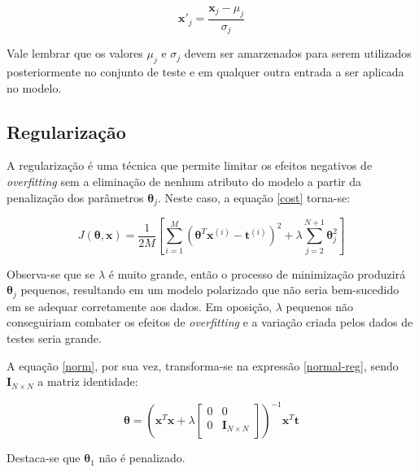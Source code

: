 \documentclass[10pt,twocolumn,letterpaper]{article}
\begin{document}
\begin {equation}
\label {norm}
\bm {x'}_j = \frac {\bm{x}_j - \mu_j}{\sigma_j}
\end{equation}

Vale lembrar que os valores \(\mu_j\) e \(\sigma_j\) devem ser amarzenados para serem utilizados posteriormente no conjunto de teste e em qualquer outra entrada a ser aplicada no modelo.

\subsection{Regularização}

\label{sec:reg}

A regularização é uma técnica que permite limitar os efeitos negativos de \textit{overfitting} sem a eliminação de nenhum atributo do modelo a partir da penalização dos parâmetros \(\bm{\theta}_j\). Neste caso, a equação \ref{cost} torna-se:

\begin{equation}
\label {cost-reg}
J(\bm{\theta}, \bm{x}) = \frac{1}{2M} \left[\displaystyle\sum_{i=1}^{M} \left(\bm{\theta}^T\bm{x}^{(i)} - \bm{t}^{(i)}\right)^2 + \lambda \displaystyle\sum_{j=2}^{N + 1} \bm{\theta}_j^2 \right]
\end{equation}

Observa-se que se \(\lambda\) é muito grande, então o processo de minimização produzirá \(\bm{\theta}_j\) pequenos, resultando em um modelo polarizado que não seria bem-sucedido em se adequar corretamente aos dados. Em oposição, \(\lambda\) pequenos não conseguiriam combater os efeitos de \textit{overfitting} e a variação criada pelos dados de testes seria grande.

A equação \ref{norm}, por sua vez, transforma-se na expressão \ref{normal-reg}, sendo \(\bm{I}_{N \times N}\) a matriz identidade:

\begin{equation}
\label {normal-reg}
\bm{\theta} = \left(\bm{x}^T\bm{x} + \lambda
\begin{bmatrix}
    0       & 0 \\
    0       & \bm{I}_{N \times N} \\
\end{bmatrix}
\right)^{-1} \bm{x}^T \bm{t}
\end{equation}

Destaca-se que \(\bm{\theta}_1\) não é penalizado.

\end{document}

